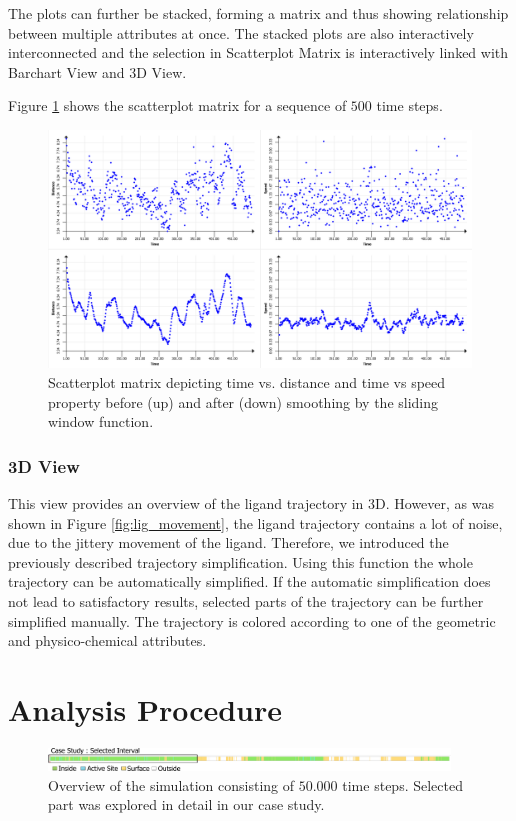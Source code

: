 \documentclass[twocolumn]{bmcart}%
\begin{document}
The plots can further be stacked, forming a matrix and thus showing relationship between multiple attributes at once.
The stacked plots are also interactively interconnected and the selection in Scatterplot Matrix is interactively linked with Barchart View and 3D View.

Figure \ref{fig:scatterplot} shows the scatterplot matrix for a sequence of $500$ time steps.

\begin{figure}[htb]
	\centering
  \includegraphics[width=0.95\linewidth]{img/scatterplot.png}
  \caption{\label{fig:scatterplot} Scatterplot matrix depicting time vs. distance and time vs speed property before (up) and after (down) smoothing by the sliding window function.}
\end{figure}

\subsubsection*{3D View}
This view provides an overview of the ligand trajectory in 3D.
However, as was shown in Figure \ref{fig:lig_movement}, the ligand trajectory contains a lot of noise, due to the jittery movement of the ligand.
Therefore, we introduced the previously described trajectory simplification.
Using this function the whole trajectory can be automatically simplified.
If the automatic simplification does not lead to satisfactory results, selected parts of the trajectory can be further simplified manually.
The trajectory is colored according to one of the geometric and physico-chemical attributes. 

\section*{Analysis Procedure}

\begin{figure}[htb]
	\centering
  \includegraphics[width=0.95\textwidth]{img/case_overview.pdf}
  \caption{\label{fig:case_overview} Overview of the simulation consisting of $50.000$ time steps. Selected part was explored in detail in our case study.}
\end{figure}
\end{document}

